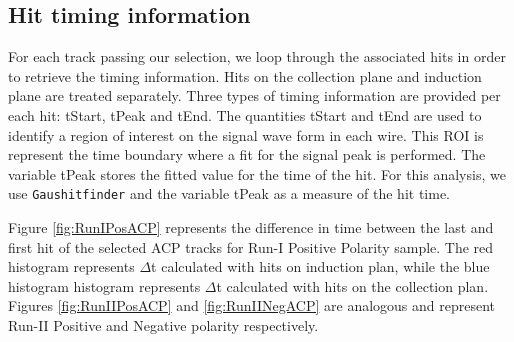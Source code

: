 \subsection{Hit timing information}\label{sec:HitTime}
For each track passing our selection, we loop through the associated hits in order to retrieve the timing information. Hits on the collection plane and induction plane are treated separately. Three types of timing information are provided per each hit: tStart, tPeak and tEnd. The quantities tStart and tEnd are used to identify a region of interest on the signal wave form in each wire. This ROI is represent the time boundary where a fit for the signal peak is performed. The variable tPeak stores the fitted value for the time of the hit. For this analysis, we use \verb!Gaushitfinder! and the variable tPeak as a measure of the hit time.


Figure \ref{fig:RunIPosACP} represents the difference in time between the last and first hit of the selected ACP tracks for Run-I Positive Polarity sample. The red histogram represents $\Delta$t calculated with hits on induction plan, while the blue histogram histogram represents $\Delta$t calculated with hits on the collection plan. Figures \ref{fig:RunIIPosACP} and \ref{fig:RunIINegACP} are analogous and represent Run-II Positive and Negative polarity respectively.



